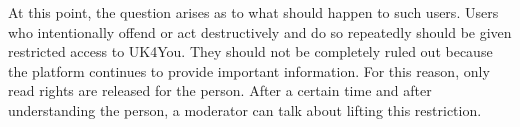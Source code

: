 At this point, the question arises as to what should happen to such users.
Users who intentionally offend or act destructively and do so repeatedly should be given restricted access to UK4You.
They should not be completely ruled out because the platform continues to provide important information.
For this reason, only read rights are released for the person.
After a certain time and after understanding the person, a moderator can talk about lifting this restriction.\\


